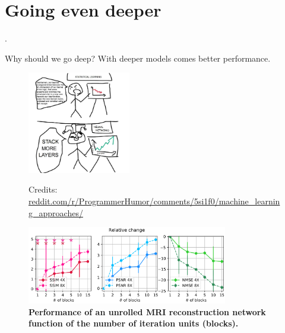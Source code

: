 \section{Going even deeper}

\begin{frame}[plain,c]
    
    \begin{center}
        \color{DarkBlue}
    \Huge \thesection. \insertsection
    \end{center}
    
\end{frame}


\begin{frame}{Why should we go deep?}
    With deeper models comes better performance.
    \begin{figure}
        \begin{overprint}
            \centering\includegraphics[width=0.4\textwidth]{Figures/shine_figures/more_layers.jpg}\caption{Credits: \href{reddit.com/r/ProgrammerHumor/comments/5si1f0/machine_learning_approaches/}{reddit.com/r/ProgrammerHumor/comments/5si1f0/machine\_learning\_approaches/}}
            \centering\includegraphics[width=0.78\textwidth]{Figures/shine_figures/pezzotti.png}\caption{\textbf{Performance of an unrolled MRI reconstruction network function of the number of iteration units (blocks).}\footnotemark}
        \end{overprint}
    \end{figure}
    \vspace{-4em}
\end{frame}

